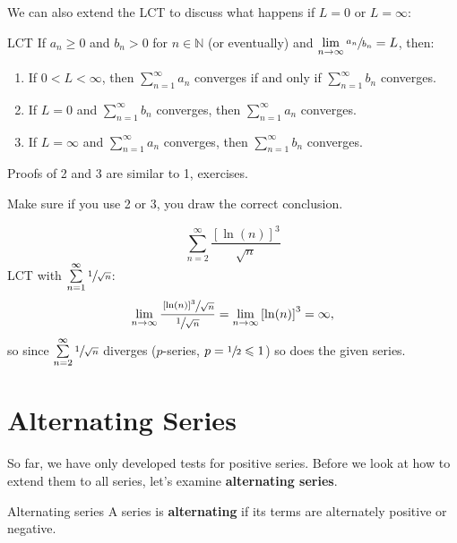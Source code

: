 We can also extend the LCT to discuss what happens if $ L=0 $ or $ L=\infty $:
\begin{Theorem}{LCT}{}
    If $ a_n\geqslant 0 $ and $ b_n>0 $ for $ n\in\mathbb{N} $ (or eventually)
    and $ \lim\limits_{{n} \to {\infty}} \sfrac{a_n}{b_n} =L $, then:
    \begin{enumerate}
        \item If $ 0<L<\infty $, then $ \sum\limits_{n=1}^{\infty} a_n $ converges
              if and only if $ \sum\limits_{n=1}^{\infty}b_n $ converges.
        \item If $ L=0 $ and $ \sum\limits_{n=1}^{\infty} b_n $ converges, then
              $ \sum\limits_{n=1}^{\infty} a_n $ converges.
        \item If $ L=\infty $ and $ \sum\limits_{n=1}^{\infty} a_n $ converges,
              then $ \sum\limits_{n=1}^{\infty} b_n $ converges.
    \end{enumerate}
\end{Theorem}
Proofs of 2 and 3 are similar to 1, exercises.

\begin{Remark}{}{}
    Make sure if you use 2 or 3, you draw the correct conclusion.
\end{Remark}

\begin{Example}{}{}
    \[ \sum\limits_{n=2}^{\infty} \frac{\left[ \ln(n) \right]^3}{\sqrt{n}}  \]
    LCT with $ \sum\limits_{n=1}^{\infty} \sfrac{1}{\sqrt{n}} $:
    \[ \lim\limits_{{n} \to {\infty}}
        \frac{\sfrac{\left[ \ln(n) \right]^3}{\sqrt{n}}}{\sfrac{1}{\sqrt{n}}}=
        \lim\limits_{{n} \to {\infty}} \left[ \ln(n) \right]^3=\infty, \]
    so since $ \sum\limits_{n=2}^{\infty} \sfrac{1}{\sqrt{n}} $ diverges
    ($ p $-series, $ p=\sfrac{1}{2}\leqslant 1 $) so does
    the given series.
\end{Example}

\setcounter{section}{6}
\section{Alternating Series}
So far, we have only developed tests for positive series. Before we look at how to
extend them to all series, let's examine \textbf{alternating series}.

\begin{Definition}{Alternating series}{}
    A series is \textbf{alternating} if its terms are alternately positive
    or negative.
\end{Definition}

